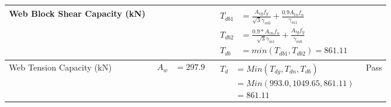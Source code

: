 \documentclass{article}%
\begin{document}
\begin{longtable}{|p{4cm}|p{6cm}|p{5.5cm}|p{1.5cm}|}
\hline%
Web Block Shear Capacity (kN)&&$\begin{aligned}T_{db1} &= \frac{A_{vg} f_{y}}{\sqrt{3} \gamma_{m0}} + \frac{0.9 A_{tn} f_{u}}{\gamma_{m1}}\\ T_{db2} &= \frac{0.9*A_{vn} f_{u}}{\sqrt{3} \gamma_{m1}} + \frac{A_{tg} f_{y}}{\gamma_{m0}}\\ T_{db} &= min(T_{db1}, T_{db2})= 861.11\end{aligned}$&\\%
\hline%
Web Tension Capacity (kN)&$\begin{aligned} A_w &=297.9 \end{aligned}$&$\begin{aligned} T_d &= Min(T_{dg},T_{dn},T_{db})\\ &= Min(993.0,1049.65,861.11)\\ &=861.11\end{aligned}$&Pass\\%
\hline%
\end{longtable}

%
\newpage%
\end{document}
